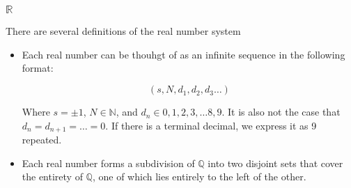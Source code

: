 \documentclass[11 pt, twoside]{article}
\begin{document}
\subsubsection{$\mathbb{R}$}

There are several definitions of the real number system
\begin{itemize}
\item Each real number can be thouhgt of as an infinite sequence in the
following format:

$$(s, N, d_1, d_2, d_3 \dots)$$

Where $s = \pm 1$, $N \in \mathbb{N}$, and $d_n \in {0, 1, 2, 3,
\dots 8, 9}$. It is also not the case that $d_n = d_{n+1} = \dots = 0$.
If there is a terminal decimal, we express it as 9 repeated.
\item Each real number forms a subdivision of $\mathbb{Q}$ into two
disjoint sets that cover the entirety of $\mathbb{Q}$, one of which
lies entirely to the left of the other.
\end{itemize}
\end{document}
